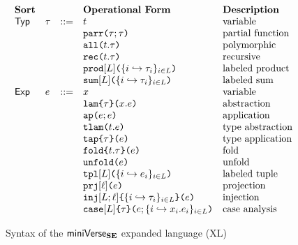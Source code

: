 \begin{figure}[h!]
\[\begin{array}{lllllll}
\textbf{Sort} & & & \textbf{Operational Form} %
& \textbf{Description}\\
\mathsf{Typ} 
& \tau & ::= & t 
& \text{variable}\\
&&& \aparr{\tau}{\tau} 
& \text{partial function}\\
&&& \aall{t}{\tau} 
& \text{polymorphic}\\
&&& \arec{t}{\tau} 
& \text{recursive}\\
&&& \aprod{\labelset}{\mapschema{\tau}{i}{\labelset}} 
& \text{labeled product}\\
&&& \asum{\labelset}{\mapschema{\tau}{i}{\labelset}} 
& \text{labeled sum}\\
\mathsf{Exp} & e & ::= & x 
& \text{variable}\\
&&& \aelam{\tau}{x}{e} 
& \text{abstraction}\\
&&& \aeap{e}{e} 
& \text{application}\\
&&& \aetlam{t}{e} 
& \text{type abstraction}\\
&&& \aetap{e}{\tau} 
& \text{type application}\\
&&& \aefold{t}{\tau}{e} 
& \text{fold}\\
&&& \aeunfold{e} 
& \text{unfold}\\
&&& \aetpl{\labelset}{\mapschema{e}{i}{\labelset}} 
& \text{labeled tuple}\\
&&& \aepr{\ell}{e} 
& \text{projection}\\
&&& \aein{\labelset}{\ell}{\mapschema{\tau}{i}{\labelset}}{e} 
& \text{injection}\\
&&& \aecase{\labelset}{\tau}{e}{\mapschemab{x}{e}{i}{\labelset}} 
& \text{case analysis}
\end{array}\]
\caption[Syntax of the XL of $\miniVerseUE$]{Syntax of the $\miniVerseUE$ expanded language (XL)%
}
\label{fig:U-expanded-terms}
\end{figure}


